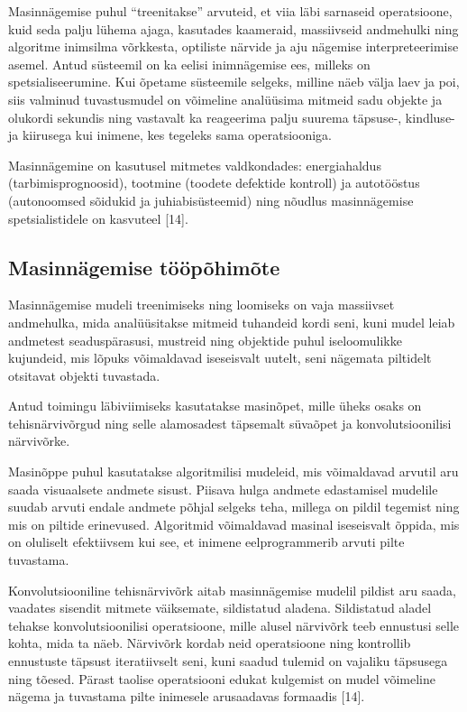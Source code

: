 \documentclass[12pt,a4paper]{report}
\begin{document}
Masinnägemise puhul ``treenitakse'' arvuteid, et viia läbi sarnaseid operatsioone, kuid seda palju lühema ajaga, kasutades kaameraid, massiivseid andmehulki ning algoritme inimsilma võrkkesta, optiliste närvide ja aju nägemise interpreteerimise asemel. Antud süsteemil on ka eelisi inimnägemise ees, milleks on spetsialiseerumine. Kui õpetame süsteemile selgeks, milline näeb välja laev ja poi, siis valminud tuvastusmudel on võimeline analüüsima mitmeid sadu objekte ja olukordi sekundis ning vastavalt ka reageerima palju suurema täpsuse-, kindluse- ja kiirusega kui inimene, kes tegeleks sama operatsiooniga.

Masinnägemine on kasutusel mitmetes valdkondades: energiahaldus (tarbimisprognoosid), tootmine (toodete defektide kontroll) ja autotööstus (autonoomsed sõidukid ja juhiabisüsteemid) ning nõudlus masinnägemise spetsialistidele on kasvuteel {[}14{]}.

\subsection{Masinnägemise tööpõhimõte}\label{masinnuxe4gemise-tuxf6uxf6puxf5himuxf5te}

Masinnägemise mudeli treenimiseks ning loomiseks on vaja massiivset andmehulka, mida analüüsitakse mitmeid tuhandeid kordi seni, kuni mudel leiab andmetest seaduspärasusi, mustreid ning objektide puhul iseloomulikke kujundeid, mis lõpuks võimaldavad iseseisvalt uutelt, seni nägemata piltidelt otsitavat objekti tuvastada.

Antud toimingu läbiviimiseks kasutatakse masinõpet, mille üheks osaks on tehisnärvivõrgud ning selle alamosadest täpsemalt süvaõpet ja konvolutsioonilisi närvivõrke.

Masinõppe puhul kasutatakse algoritmilisi mudeleid, mis võimaldavad arvutil aru saada visuaalsete andmete sisust. Piisava hulga andmete edastamisel mudelile suudab arvuti endale andmete põhjal selgeks teha, millega on pildil tegemist ning mis on piltide erinevused. Algoritmid võimaldavad masinal iseseisvalt õppida, mis on oluliselt efektiivsem kui see, et inimene eelprogrammerib arvuti pilte tuvastama.

Konvolutsiooniline tehisnärvivõrk aitab masinnägemise mudelil pildist aru saada, vaadates sisendit mitmete väiksemate, sildistatud aladena. Sildistatud aladel tehakse konvolutsioonilisi operatsioone, mille alusel närvivõrk teeb ennustusi selle kohta, mida ta näeb. Närvivõrk kordab neid operatsioone ning kontrollib ennustuste täpsust iteratiivselt seni, kuni saadud tulemid on vajaliku täpsusega ning tõesed. Pärast taolise operatsiooni edukat kulgemist on mudel võimeline nägema ja tuvastama pilte inimesele arusaadavas formaadis {[}14{]}.
\end{document}
